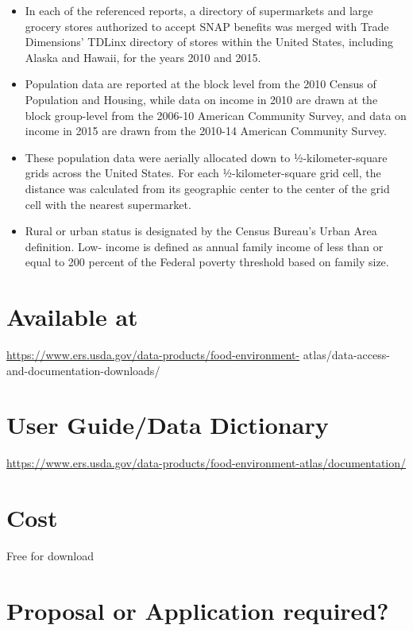 \documentclass[
]{book}
\providecommand{\tightlist}{%
  \setlength{\itemsep}{0pt}\setlength{\parskip}{0pt}}
\begin{document}
\begin{itemize}
\tightlist
\item
  In each of the referenced reports, a directory of supermarkets and large grocery stores authorized to accept SNAP benefits was merged with Trade Dimensions' TDLinx directory of stores within the United States, including Alaska and Hawaii, for the years 2010 and 2015.
\item
  Population data are reported at the block level from the 2010 Census of Population and Housing, while data on income in 2010 are drawn at the block group-level from the 2006-10 American Community Survey, and data on income in 2015 are drawn from the 2010-14 American Community Survey.
\item
  These population data were aerially allocated down to ½-kilometer-square grids across the United States. For each ½-kilometer-square grid cell, the distance was calculated from its geographic center to the center of the grid cell with the nearest supermarket.
\item
  Rural or urban status is designated by the Census Bureau's Urban Area definition. Low- income is defined as annual family income of less than or equal to 200 percent of the Federal poverty threshold based on family size.
\end{itemize}

\hypertarget{available-at-26}{%
\section{Available at}\label{available-at-26}}

\url{https://www.ers.usda.gov/data-products/food-environment-} atlas/data-access-and-documentation-downloads/

\hypertarget{user-guidedata-dictionary-26}{%
\section{User Guide/Data Dictionary}\label{user-guidedata-dictionary-26}}

\url{https://www.ers.usda.gov/data-products/food-environment-atlas/documentation/}

\hypertarget{cost-26}{%
\section{Cost}\label{cost-26}}

Free for download

\hypertarget{proposal-or-application-required-26}{%
\section{Proposal or Application required?}\label{proposal-or-application-required-26}}
\end{document}
